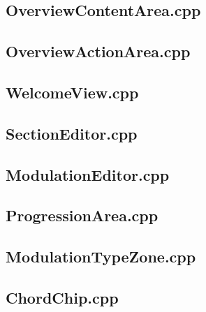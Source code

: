 \subsection{OverviewContentArea.cpp}


\subsection{OverviewActionArea.cpp}


\subsection{WelcomeView.cpp}


\subsection{SectionEditor.cpp}


\subsection{ModulationEditor.cpp}


\subsection{ProgressionArea.cpp}


\subsection{ModulationTypeZone.cpp}


\subsection{ChordChip.cpp}


